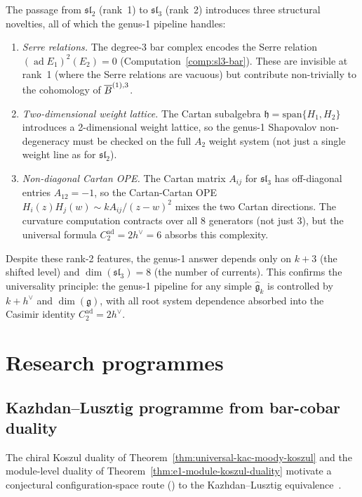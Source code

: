 \begin{remark}\label{rem:sl3-rank2}
The passage from $\mathfrak{sl}_2$ (rank~1) to $\mathfrak{sl}_3$ (rank~2) introduces three structural novelties, all of which the genus-1 pipeline handles:
\begin{enumerate}
\item \emph{Serre relations.}  The degree-3 bar complex encodes the Serre relation $(\operatorname{ad} E_1)^2(E_2) = 0$ (Computation~\ref{comp:sl3-bar}).  These are invisible at rank~1 (where the Serre relations are vacuous) but contribute non-trivially to the cohomology of $\overline{B}^{(1),3}$.
\item \emph{Two-dimensional weight lattice.}  The Cartan subalgebra $\mathfrak{h} = \mathrm{span}\{H_1, H_2\}$ introduces a 2-dimensional weight lattice, so the genus-1 Shapovalov non-degeneracy must be checked on the full $A_2$ weight system (not just a single weight line as for $\mathfrak{sl}_2$).
\item \emph{Non-diagonal Cartan OPE.}  The Cartan matrix $A_{ij}$ for $\mathfrak{sl}_3$ has off-diagonal entries $A_{12} = -1$, so the Cartan-Cartan OPE $H_i(z)H_j(w) \sim kA_{ij}/(z-w)^2$ mixes the two Cartan directions.  The curvature computation contracts over all $8$ generators (not just $3$), but the universal formula $C_2^{\mathrm{ad}} = 2h^\vee = 6$ absorbs this complexity.
\end{enumerate}

Despite these rank-2 features, the genus-1 answer depends only on $k+3$ (the shifted level) and $\dim(\mathfrak{sl}_3) = 8$ (the number of currents).  This confirms the universality principle: the genus-1 pipeline for any simple $\widehat{\mathfrak{g}}_k$ is controlled by $k + h^\vee$ and $\dim(\mathfrak{g})$, with all root system dependence absorbed into the Casimir identity $C_2^{\mathrm{ad}} = 2h^\vee$.
\end{remark}

\section{Research programmes}

\subsection{Kazhdan--Lusztig programme from bar-cobar duality}
\label{subsec:kl-from-bar-cobar}

The chiral Koszul duality of Theorem~\ref{thm:universal-kac-moody-koszul}
and the module-level duality of Theorem~\ref{thm:e1-module-koszul-duality}
motivate a conjectural configuration-space route
(\ClaimStatusConjectured) to the Kazhdan--Lusztig
equivalence~\cite{KL93}.


